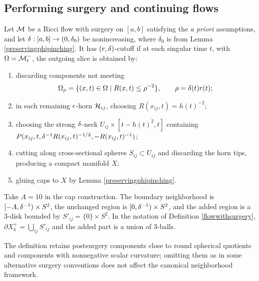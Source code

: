 \subsection{Performing surgery and continuing flows}
\label{II.4.4}

\begin{definition}
  \label{def:kl-performing-surgery-continuing-flows-ricci-flow-cutoff}
\label{rdeltacutoffflowdef}
Let ${\mathcal M}$ be a Ricci flow with surgery on $[a,b]$ satisfying the
\emph{a priori} assumptions, and let $\delta:[a,b]\rightarrow(0,\delta_0)$ be nonincreasing,
where $\delta_0$ is from Lemma \ref{preservingphipinching}. It has
$(r,\delta)$-cutoff if at each singular time $t$, with
$\Omega={\mathcal M}_t^-$, the outgoing slice is obtained by:
\begin{enumerate}
\item discarding components not meeting
\[
\Omega_\rho=\{(x,t)\in\Omega\mid R(x,t)\leq\rho^{-2}\},\qquad
\rho=\delta(t)r(t);
\]
\item in each remaining $\epsilon$-horn ${\mathcal H}_{ij}$, choosing
$R(x_{ij},t)=h(t)^{-2}$;
\item choosing the strong $\delta$-neck
$U_{ij}\times[t-h(t)^2,t]$ containing
$P(x_{ij},t,\delta^{-1}R(x_{ij},t)^{-1/2},-R(x_{ij},t)^{-1})$;
\item cutting along cross-sectional spheres $S_{ij}\subset U_{ij}$ and
discarding the horn tips, producing a compact manifold $X$;
\item gluing caps to $X$ by Lemma \ref{preservingphipinching}.
\end{enumerate}
\end{definition}

Take $A=10$ in the cap construction. The boundary neighborhood is
$[-A,\delta^{-1})\times S^2$, the unchanged region is
$[0,\delta^{-1})\times S^2$, and the added region is a $3$-disk bounded by
$S'_{ij}=\{0\}\times S^2$. In the notation of Definition
\ref{flowwithsurgery}, $\partial X_k^+=\bigcup_{ij}S'_{ij}$ and the
added part is a union of $3$-balls.

\begin{remark}
  \label{rem:kl-performing-surgery-continuing-flows-existence-canonical-neighborhoods}
The definition retains postsurgery components close to round spherical
quotients and components with nonnegative scalar curvature; omitting them as
in some alternative surgery conventions does not affect the canonical
neighborhood framework.
\end{remark}

